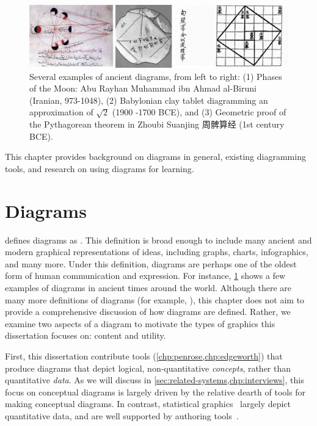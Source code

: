 \begin{figure}[h]
    \centering
    \includegraphics[width=\linewidth]{assets/related-work/historical-diagrams.pdf}
    \caption{Several examples of ancient diagrams, from left to right: (1) Phases of the Moon: Abu Rayhan Muhammad ibn Ahmad al-Biruni (Iranian, 973-1048), (2) Babylonian clay tablet diagramming an approximation of $\sqrt{2}$ (1900 -1700 BCE), and (3) Geometric proof of the Pythagorean theorem in Zhoubi Suanjing 周髀算经 (1st century BCE).}
    \label{fig:ancient-diagrams}
\end{figure}

This chapter provides background on diagrams in general, existing diagramming tools, and research on using diagrams for learning.

\section{Diagrams}
\label{sec:diagrams}

\citet{tversky_diagrams_2017,tversky_visualizing_2011} defines diagrams as . This definition is broad enough to include many ancient and modern graphical representations of ideas, including graphs, charts, infographics, and many more. Under this definition, diagrams are perhaps one of the oldest form of human communication and expression. For instance, \cref{fig:ancient-diagrams} shows a few examples of diagrams in ancient times around the world. Although there are many more definitions of diagrams (for example, \cite{bender_culture_2010,card_readings_1999,infographics,arnheim_visual_1969,tufte1983visual}), this chapter does not aim to provide a comprehensive discussion of how diagrams are defined. Rather, we examine two aspects of a diagram to motivate the types of graphics this dissertation focuses on: content and utility.

First, this dissertation contribute tools (\cref{chp:penrose,chp:edgeworth}) that produce diagrams that depict logical, non-quantitative \textit{concepts}, rather than quantitative \textit{data}. As we will discuss in \cref{sec:related-systems,chp:interviews}, this focus on conceptual diagrams is largely driven by the relative dearth of tools for making conceptual diagrams. In contrast, statistical graphics~\cite{wilkinson_grammar_2012} largely depict quantitative data, and are well supported by authoring tools~\cite{d3, vega}. 

